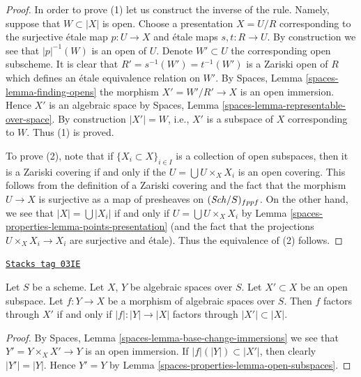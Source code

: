 \begin{proof}
In order to prove (1) let us construct the inverse of the rule.
Namely, suppose that $W \subset |X|$ is open. Choose a presentation
$X = U/R$ corresponding to the surjective \'etale map
$p : U \to X$ and \'etale maps $s, t : R \to U$.
By construction we see that $|p|^{-1}(W)$ is an
open of $U$. Denote $W' \subset U$ the corresponding open subscheme.
It is clear that $R' = s^{-1}(W') = t^{-1}(W')$ is a Zariski open
of $R$ which defines an \'etale equivalence relation on $W'$.
By Spaces, Lemma \ref{spaces-lemma-finding-opens} the morphism
$X' = W'/R' \to X$ is an open immersion. Hence $X'$ is an algebraic space
by Spaces, Lemma \ref{spaces-lemma-representable-over-space}.
By construction $|X'| = W$, i.e., $X'$ is a subspace of $X$
corresponding to $W$. Thus (1) is proved.

\medskip\noindent
To prove (2), note that if $\{X_i \subset X\}_{i \in I}$ is a collection
of open subspaces, then it is a Zariski covering if and only if the
$U = \bigcup U \times_X X_i$ is an open covering. This follows from
the definition of a Zariski covering and the fact that the morphism
$U \to X$ is surjective as a map of presheaves on $(\mathit{Sch}/S)_{fppf}$.
On the other hand, we see that $|X| = \bigcup |X_i|$ if and only if
$U = \bigcup U \times_X X_i$ by Lemma \ref{spaces-properties-lemma-points-presentation}
(and the fact that the projections $U \times_X X_i \to X_i$ are surjective
and \'etale). Thus the equivalence of (2) follows.
\end{proof}

\begin{lemma}
\label{spaces-properties-lemma-factor-through-open-subspace}
\href{https://stacks.math.columbia.edu/tag/03IE}{\texttt{Stacks tag 03IE}}

Let $S$ be a scheme.
Let $X$, $Y$ be algebraic spaces over $S$.
Let $X' \subset X$ be an open subspace.
Let $f : Y \to X$ be a morphism of algebraic spaces over $S$.
Then $f$ factors through $X'$ if and only if $|f| : |Y| \to |X|$
factors through $|X'| \subset |X|$.
\end{lemma}

\begin{proof}
By Spaces, Lemma \ref{spaces-lemma-base-change-immersions}
we see that $Y' = Y \times_X X' \to Y$ is an open immersion.
If $|f|(|Y|) \subset |X'|$, then clearly $|Y'| = |Y|$. Hence $Y' = Y$ by
Lemma \ref{spaces-properties-lemma-open-subspaces}.
\end{proof}

